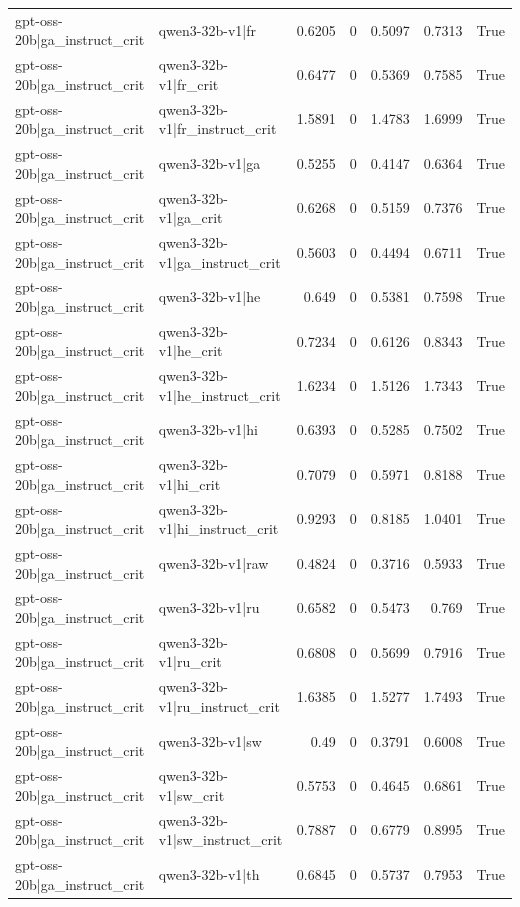 \begin{table}
\begin{tabular}{l l r r r r l}
gpt-oss-20b|ga_instruct_crit & qwen3-32b-v1|fr & 0.6205 & 0 & 0.5097 & 0.7313 & True \\
gpt-oss-20b|ga_instruct_crit & qwen3-32b-v1|fr_crit & 0.6477 & 0 & 0.5369 & 0.7585 & True \\
gpt-oss-20b|ga_instruct_crit & qwen3-32b-v1|fr_instruct_crit & 1.5891 & 0 & 1.4783 & 1.6999 & True \\
gpt-oss-20b|ga_instruct_crit & qwen3-32b-v1|ga & 0.5255 & 0 & 0.4147 & 0.6364 & True \\
gpt-oss-20b|ga_instruct_crit & qwen3-32b-v1|ga_crit & 0.6268 & 0 & 0.5159 & 0.7376 & True \\
gpt-oss-20b|ga_instruct_crit & qwen3-32b-v1|ga_instruct_crit & 0.5603 & 0 & 0.4494 & 0.6711 & True \\
gpt-oss-20b|ga_instruct_crit & qwen3-32b-v1|he & 0.649 & 0 & 0.5381 & 0.7598 & True \\
gpt-oss-20b|ga_instruct_crit & qwen3-32b-v1|he_crit & 0.7234 & 0 & 0.6126 & 0.8343 & True \\
gpt-oss-20b|ga_instruct_crit & qwen3-32b-v1|he_instruct_crit & 1.6234 & 0 & 1.5126 & 1.7343 & True \\
gpt-oss-20b|ga_instruct_crit & qwen3-32b-v1|hi & 0.6393 & 0 & 0.5285 & 0.7502 & True \\
gpt-oss-20b|ga_instruct_crit & qwen3-32b-v1|hi_crit & 0.7079 & 0 & 0.5971 & 0.8188 & True \\
gpt-oss-20b|ga_instruct_crit & qwen3-32b-v1|hi_instruct_crit & 0.9293 & 0 & 0.8185 & 1.0401 & True \\
gpt-oss-20b|ga_instruct_crit & qwen3-32b-v1|raw & 0.4824 & 0 & 0.3716 & 0.5933 & True \\
gpt-oss-20b|ga_instruct_crit & qwen3-32b-v1|ru & 0.6582 & 0 & 0.5473 & 0.769 & True \\
gpt-oss-20b|ga_instruct_crit & qwen3-32b-v1|ru_crit & 0.6808 & 0 & 0.5699 & 0.7916 & True \\
gpt-oss-20b|ga_instruct_crit & qwen3-32b-v1|ru_instruct_crit & 1.6385 & 0 & 1.5277 & 1.7493 & True \\
gpt-oss-20b|ga_instruct_crit & qwen3-32b-v1|sw & 0.49 & 0 & 0.3791 & 0.6008 & True \\
gpt-oss-20b|ga_instruct_crit & qwen3-32b-v1|sw_crit & 0.5753 & 0 & 0.4645 & 0.6861 & True \\
gpt-oss-20b|ga_instruct_crit & qwen3-32b-v1|sw_instruct_crit & 0.7887 & 0 & 0.6779 & 0.8995 & True \\
gpt-oss-20b|ga_instruct_crit & qwen3-32b-v1|th & 0.6845 & 0 & 0.5737 & 0.7953 & True \\

\end{tabular}
\end{table}
